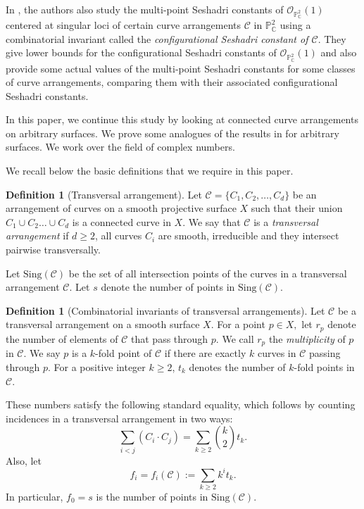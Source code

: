 \documentclass[12pt,reqno]{amsart}
\theoremstyle{plain}
\numberwithin{equation}{section}
\theoremstyle{definition}
\newtheorem{definition}[theorem]{Definition}
\begin{document}
	In \cite{JP}, the authors also study the multi-point Seshadri constants of $\mathcal{O}_{\mathbb{P}^{2}_{\mathbb{C}}}(1)$ centered at singular loci of certain curve arrangements $\mathcal{C}$ in ${\mathbb{P}^{2}_{\mathbb{C}}}$ using a combinatorial invariant called the  \textit{configurational Seshadri constant of $\mathcal{C}$}. They give lower bounds for the configurational Seshadri constants of $\mathcal{O}_{\mathbb{P}^{2}_{\mathbb{C}}}(1)$ and also provide some actual values of the multi-point Seshadri constants for some classes of curve arrangements, comparing them with their associated configurational Seshadri constants.
	
In this paper, we continue this study by looking at connected curve arrangements on arbitrary surfaces. We prove some analogues of the results in \cite{JP} for arbitrary surfaces. We work over the field of complex numbers. 


We recall below the basic definitions that we require in this paper. 	
	

	\begin{definition}[Transversal arrangement]
		Let $\mathcal{C}=\{C_1,C_2, \ldots ,C_d\}$ be an arrangement of curves
		on a smooth projective surface $X$ such that their union $C_1 \cup C_2 \dots \cup C_d$ is a connected curve in $X$. 
		We say that $\mathcal{C}$ is a \emph{transversal arrangement}
		if $d\geq 2$, all  curves $C_i$ are smooth, irreducible 
		and they intersect pairwise transversally.
	\end{definition}
	
	Let $\text{Sing}(\mathcal{C})$ be the set of all intersection points
	of the curves in a transversal arrangement $\mathcal{C}$. 
	Let $s$ denote the number of points in $\text{Sing}(\mathcal{C})$. 
	
	
	\begin{definition}[Combinatorial invariants of transversal arrangements]
		Let	$\mathcal{C}$ be a transversal arrangement on a smooth surface
		$X$. For a point $p\in X,$
		let $r_p$ denote the  number of elements of $\mathcal{C}$ that pass
		through $p$. We call $r_p$ the \textit{multiplicity} of $p$ in
		$\mathcal{C}.$ We say $p$ is a $k$-fold point of $\mathcal{C}$ 
		if there are exactly $k$ curves in $\mathcal{C}$ passing through $p.$
		For a positive integer $k\geq2$, $t_k$ denotes the number of $k$-fold points in $\mathcal{C}$.
	\end{definition}
	These numbers satisfy the following standard equality, which follows by
	counting incidences in a transversal arrangement in two ways:
	\begin{equation}\label{eq:combinatorial general}
		\sum_{i<j}(C_i\cdot C_j)=\sum_{k\geq 2}\binom{k}{2}t_k.
	\end{equation}
	Also, let $$f_i=f_i(\mathcal C) :=\sum_{k\geq 2}k^i t_k.$$
	In particular, $f_0=s$ is the number of points in
	$\text{Sing}(\mathcal{C})$. 
	
\end{document}
